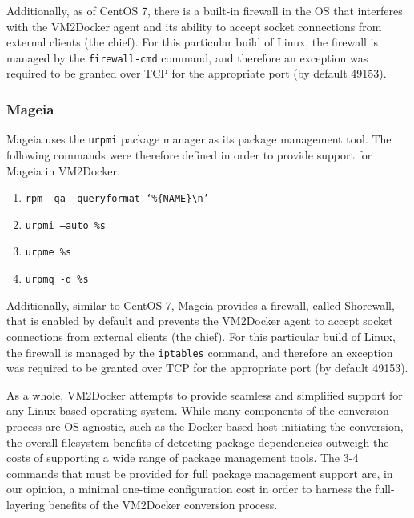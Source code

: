 Additionally, as of CentOS 7, there is a built-in firewall in the OS that interferes with the VM2Docker agent and its ability to accept socket connections from external clients (the chief). For this particular build of Linux, the firewall is managed by the \texttt{firewall-cmd} command, and therefore an exception was required to be granted over TCP for the appropriate port (by default 49153).

\subsubsection{Mageia}
Mageia uses the \texttt{urpmi} package manager as its package management tool. The following commands were therefore defined in order to provide support for Mageia in VM2Docker.

\begin{enumerate}
\item \texttt{rpm -qa --queryformat `\%\{NAME\}\textbackslash n'}
\item \texttt{urpmi --auto \%s}
\item \texttt{urpme \%s}
\item \texttt{urpmq -d \%s}
\end{enumerate}

Additionally, similar to CentOS 7, Mageia provides a firewall, called Shorewall, that is enabled by default and prevents the VM2Docker agent to accept socket connections from external clients (the chief). For this particular build of Linux, the firewall is managed by the \texttt{iptables} command, and therefore an exception was required to be granted over TCP for the appropriate port (by default 49153).

As a whole, VM2Docker attempts to provide seamless and simplified support for any Linux-based operating system. While many components of the conversion process are OS-agnostic, such as the Docker-based host initiating the conversion, the overall filesystem benefits of detecting package dependencies outweigh the costs of supporting a wide range of package management tools. The 3-4 commands that must be provided for full package management support are, in our opinion, a minimal one-time configuration cost in order to harness the full-layering benefits of the VM2Docker conversion process.

